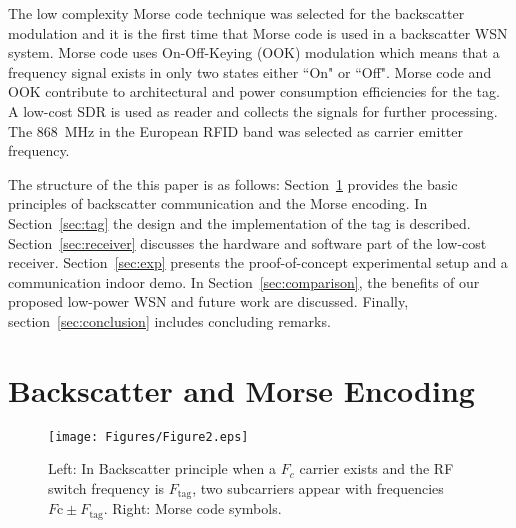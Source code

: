 \documentclass[journal]{IEEEtran}
\begin{document}
The low complexity Morse code technique was selected for the backscatter modulation and it is the first time that  Morse code is used in a backscatter WSN system. 
%
Morse code uses On-Off-Keying (OOK) modulation  which means that a  frequency  signal exists in only two states either ``On" or  ``Off".
%
Morse code and OOK contribute to architectural and power consumption efficiencies for the tag.
%
A low-cost   SDR is used as  reader and collects the signals for further processing. 
%
The $868$~MHz in the European RFID band was selected as carrier emitter frequency.

The structure of the this paper  is as follows: Section~\ref{sec:Backscatter_morse} provides the basic principles of backscatter  communication and the Morse encoding.
%
In  Section~\ref{sec:tag} the design  and the implementation of the tag is described. 
%
Section~\ref{sec:receiver} discusses the hardware and software part of the low-cost
receiver. 
%
Section~\ref{sec:exp} presents the  proof-of-concept experimental setup and a communication indoor demo.
%
In Section~\ref{sec:comparison}, the benefits of our proposed low-power WSN and future work are discussed.
%
Finally, section~\ref{sec:conclusion} includes concluding remarks.



\section{Backscatter and Morse Encoding}
\label{sec:Backscatter_morse}

\begin{figure}[t]
\centering
\texttt{[image: Figures/Figure2.eps]}
\caption{Left: In Backscatter principle when a $F_c$ carrier  exists 
and the RF switch frequency is $F_\text{tag}$, two subcarriers appear with frequencies $F\text{c} \pm F_\text{tag}$.
Right: Morse code symbols.}
\label{fig:morse}
\end{figure}
\end{document}

